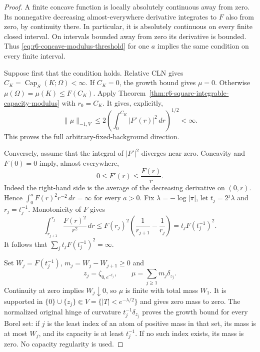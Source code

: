 \documentclass[11pt,a4paper]{article}
\numberwithin{equation}{section}
\theoremstyle{definition}
\theoremstyle{remark}
\begin{document}
\begin{proof}
A finite concave function is locally absolutely continuous away
from zero. Its nonnegative decreasing almost-everywhere derivative
integrates to $F$ also from zero, by continuity there. In particular,
it is absolutely continuous on every finite closed interval. On
intervals bounded away from zero its derivative is bounded. Thus
\eqref{eq:r6-concave-modulus-threshold} for one $a$ implies the same
condition on every finite interval.

Suppose first that the condition holds. Relative CLN gives
$C_K=\operatorname{Cap}_S(K;\Omega)<\infty$. If $C_K=0$, the
growth bound gives $\mu=0$. Otherwise
$\mu(\Omega)=\mu(K)\le F(C_K)$. Apply
Theorem~\ref{thm:r6-square-integrable-capacity-modulus} with
$r_0=C_K$. It gives, explicitly,
\[
             \|\mu\|_{-1,V}
                  \le2\left(\int_0^{C_K}|F'(r)|^2\,dr\right)^{1/2}
                  <\infty.
\]
This proves the full arbitrary-fixed-background direction.

Conversely, assume that the integral of $|F'|^2$ diverges near zero.
Concavity and $F(0)=0$ imply, almost everywhere,
\[
                    0\le F'(r)\le\frac{F(r)}r.
\]
Indeed the right-hand side is the average of the decreasing
derivative on $(0,r)$. Hence
$\int_0^a F(r)^2r^{-2}\,dr=\infty$ for every $a>0$.
Fix $\lambda=-\log|\pi|$, let $t_j=2^j\lambda$ and
$r_j=t_j^{-1}$. Monotonicity of $F$ gives
\[
 \int_{r_{j+1}}^{r_j}\frac{F(r)^2}{r^2}\,dr
       \le F(r_j)^2\left(\frac1{r_{j+1}}-\frac1{r_j}\right)
       =t_jF(t_j^{-1})^2.
\]
It follows that $\sum_j t_jF(t_j^{-1})^2=\infty$.

Set $W_j=F(t_j^{-1})$, $m_j=W_j-W_{j+1}\ge0$ and
\[
             z_j=\zeta_{0,e^{-t_j}},\qquad
             \mu=\sum_{j\ge1}m_j\delta_{z_j}.
\]
Continuity at zero implies $W_j\downarrow0$, so $\mu$ is finite
with total mass $W_1$. It is supported in
$\{0\}\cup\{z_j\}\Subset V=\{|T|<e^{-\lambda/2}\}$ and gives
zero mass to zero. The normalized original hinge of curvature
$t_j^{-1}\delta_{z_j}$ proves the growth bound for every Borel set:
if $j$ is the least index of an atom of positive mass in that set,
its mass is at most $W_j$, and its capacity is at least $t_j^{-1}$.
If no such index exists, its mass is zero. No capacity regularity
is used.


\end{proof}
\end{document}
